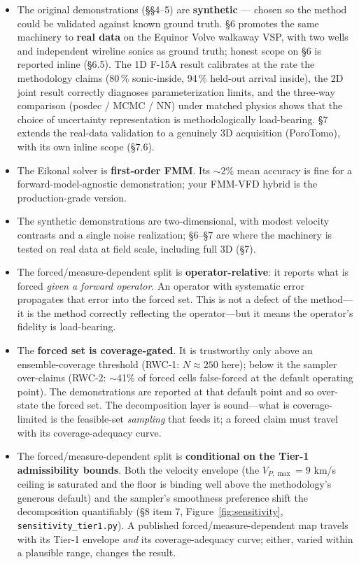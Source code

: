 \documentclass[11pt]{article}
\newcommand{\file}[1]{\texttt{#1}}
\begin{document}
\begin{itemize}
\item The original demonstrations (\S\S4--5) are \textbf{synthetic} ---
  chosen so the method could be validated against known ground truth.
  \S6 promotes the same machinery to \textbf{real data} on the Equinor
  Volve walkaway VSP, with two wells and independent wireline sonics as
  ground truth; honest scope on \S6 is reported inline (\S6.5). The 1D
  F-15A result calibrates at the rate the methodology claims (80\,\%
  sonic-inside, 94\,\% held-out arrival inside), the 2D joint result
  correctly diagnoses parameterization limits, and the three-way
  comparison (posdec / MCMC / NN) under matched physics shows that the
  choice of uncertainty representation is methodologically load-bearing.
  \S7 extends the real-data validation to a genuinely 3D acquisition
  (PoroTomo), with its own inline scope (\S7.6).
\item The Eikonal solver is \textbf{first-order FMM}. Its $\sim$2\% mean
  accuracy is fine for a forward-model-agnostic demonstration; your FMM-VFD
  hybrid is the production-grade version.
\item The synthetic demonstrations are two-dimensional, with modest
  velocity contrasts and a single noise realization; \S6--\S7 are where
  the machinery is tested on real data at field scale, including full 3D
  (\S7).
\item The forced/measure-dependent split is \textbf{operator-relative}: it
  reports what is forced \emph{given a forward operator}. An operator with
  systematic error propagates that error into the forced set. This is not a
  defect of the method---it is the method correctly reflecting the
  operator---but it means the operator's fidelity is load-bearing.
\item The \textbf{forced set is coverage-gated}. It is trustworthy only above
  an ensemble-coverage threshold (RWC-1: $N \approx 250$ here); below it the
  sampler over-claims (RWC-2: $\sim$41\% of forced cells false-forced at the
  default operating point). The demonstrations are reported at that default
  point and so over-state the forced set. The decomposition layer is
  sound---what is coverage-limited is the feasible-set \emph{sampling} that
  feeds it; a forced claim must travel with its coverage-adequacy curve.
\item The forced/measure-dependent split is \textbf{conditional on the
  Tier-1 admissibility bounds}. Both the velocity envelope (the
  $V_{P,\max} = 9$ km/s ceiling is saturated and the floor is binding well
  above the methodology's generous default) and the sampler's smoothness
  preference shift the decomposition quantifiably (\S8 item 7,
  Figure~\ref{fig:sensitivity}, \file{sensitivity\_tier1.py}). A
  published forced/measure-dependent map travels with its Tier-1 envelope
  \emph{and} its coverage-adequacy curve; either, varied within a
  plausible range, changes the result.
\end{itemize}
\end{document}
